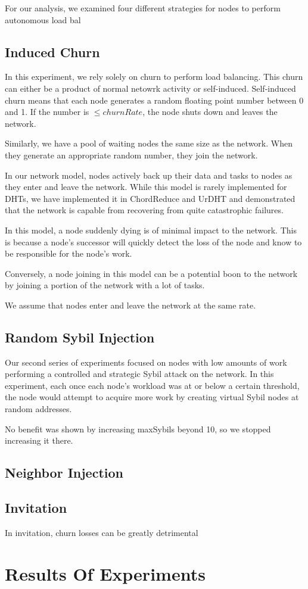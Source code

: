 For our analysis, we examined four different strategies for nodes to perform autonomous load bal



\subsection{Induced Churn}
In this experiment, we rely solely on churn to perform load balancing.
This churn can either be a product of normal netowrk activity or self-induced.
Self-induced churn means that each node generates a random floating point number between 0 and 1.
If the number is $\leq churnRate$, the node shuts down and leaves the network.

Similarly, we have a pool of waiting nodes the same size as the network.
When they generate an appropriate random number, they join the network.

In our network model, nodes actively back up their data and tasks to nodes as they enter and leave the network.
While this model is rarely implemented for DHTs, we have implemented it in ChordReduce\cite{chordreduce} and UrDHT\cite{urdht} and demonstrated that the network is capable from recovering from quite catastrophic failures.

In this model, a node suddenly dying is of minimal impact to the network.
This is because a node's successor will quickly detect the loss of the node and know to be responsible for the node's work.

Conversely, a node joining in this model can be a potential boon to the network by joining a portion of the network with a lot of tasks.



We assume that nodes enter and leave the network at the same rate.


\subsection{Random Sybil Injection}
Our second series of experiments focused on nodes with low amounts of work performing a controlled and strategic Sybil attack \cite{sybil} on the network.
In this experiment, each once each node's workload was at or below a certain threshold, the node would attempt to acquire more work by creating virtual Sybil nodes at random addresses.




No benefit was shown by increasing maxSybils beyond 10, so we stopped increasing it there.


\subsection{Neighbor Injection}

\subsection{Invitation}

In invitation, churn losses can be greatly detrimental

\section{Results Of Experiments}
